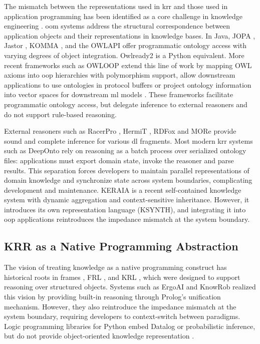 \documentclass[a4paper,fleqn]{cas-sc}
\begin{document}
The mismatch between the representations used in \ac{krr} and those used in application programming has been identified as a core challenge in knowledge engineering \citep{ledvinka2020comparison,baset2018object,banse2024owl2proto}. \Ac{oom} systems address the structural correspondence between application objects and their representations in knowledge bases. In Java, JOPA \citep{ledvinka2016jopa}, Jastor \citep{szekely2009jastor}, KOMMA \citep{wenzel2010komma}, and the OWLAPI \citep{horridge2011owl} offer programmatic ontology access with varying degrees of object integration. Owlready2 \citep{lamy2017owlready} is a Python equivalent. More recent frameworks such as OWLOOP \citep{buoncompagni2024owloop} extend this line of work by mapping OWL axioms into \ac{oop} hierarchies with polymorphism support, allow downstream applications to use ontologies in protocol buffers \citep{banse2024owl2proto} or project ontology information into vector spaces for downstream \ac{ml} models \citep{zhapa2023mowl}. These frameworks facilitate programmatic ontology access, but delegate inference to external reasoners and do not support rule-based reasoning.

External reasoners such as RacerPro \citep{haarslev2012racerpro}, HermiT \citep{glimm2014hermit}, RDFox \citep{nenov2015rdfox} and MORe \citep{armas2012more} provide sound and complete inference for various \ac{dl} fragments. Most modern \ac{krr} systems such as DeepOnto \citep{he2024deeponto} rely on reasoning as a batch process over serialized ontology files: applications must export domain state, invoke the reasoner and parse results. This separation forces developers to maintain parallel representations of domain knowledge and synchronize state across system boundaries, complicating development and maintenance. KERAIA \citep{varey2025keraia} is a recent self-contained knowledge system with dynamic aggregation and context-sensitive inheritance. However, it introduces its own representation language (KSYNTH), and integrating it into \ac{oop} applications reintroduces the impedance mismatch at the system boundary.

\subsection{KRR as a Native Programming Abstraction}

The vision of treating knowledge as a native programming construct has historical roots in frames \citep{minsky1974framework}, FRL \citep{roberts1977frl}, and KRL \citep{bobrow1977overview}, which were designed to support reasoning over structured objects. Systems such as ErgoAI \citep{kifer2018ergoai} and KnowRob \citep{beetz2018know} realized this vision by providing built-in reasoning through Prolog's unification mechanism. However, they also reintroduce the impedance mismatch at the system boundary, requiring developers to context-switch between paradigms. Logic programming libraries for Python embed Datalog or probabilistic inference, but do not provide object-oriented knowledge representation \citep{carbonnelle2020pydatalog,dries2015problog2}.
\end{document}
